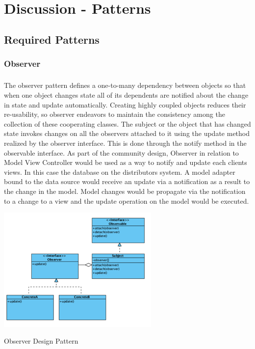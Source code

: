 \chapter{Discussion - Patterns}
\section{Required Patterns}
	
\subsection{Observer}	
	\vspace{3 mm}
	\begin{multicols}{2}
	\paragraph{}
		The observer pattern defines a one-to-many dependency between objects so that when one object changes state all of its dependents are notified 
		about the change in state and update automatically. Creating highly coupled objects reduces their re-usability, so observer endeavors to 
		maintain the consistency among the collection of these cooperating classes. The subject or the object that has changed state invokes changes 
		on all the observers attached to it using the update method realized by the observer interface. This is done through the notify method in 
		the observable interface.
		\newline
		\newline
		As part of the community design, Observer in relation to Model View Controller would be used as a way to notify and update each clients views.  
		In this case the database on the distributors system.  A model adapter bound to the data source would receive an update via a notification as 
		a result to the change in the model.  Model changes would be propagate via the notification to a change to a view and the update operation 
		on the model would be executed.
		\newline
		\newline
		
		\begin{figurehere}
			\includegraphics[scale=0.65]{figures/observer.png}
			\caption{Observer Design Pattern}
		\end{figurehere}
		
	\end{multicols}
